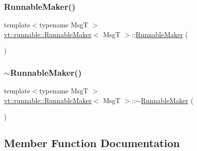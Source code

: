 \subsubsection{\texorpdfstring{Runnable\+Maker()}{RunnableMaker()}\hspace{0.1cm}{\footnotesize\ttfamily [3/3]}}
{\footnotesize\ttfamily template$<$typename MsgT $>$ \\
\hyperlink{structvt_1_1runnable_1_1_runnable_maker}{vt\+::runnable\+::\+Runnable\+Maker}$<$ MsgT $>$\+::\hyperlink{structvt_1_1runnable_1_1_runnable_maker}{Runnable\+Maker} (\begin{DoxyParamCaption}\item[{\hyperlink{structvt_1_1runnable_1_1_runnable_maker}{Runnable\+Maker}$<$ MsgT $>$ \&\&}]{ }\end{DoxyParamCaption})\hspace{0.3cm}{\ttfamily [default]}}

\mbox{\label{structvt_1_1runnable_1_1_runnable_maker_a0700d91c1114ae97ac74a4841ec2499c}} 
\subsubsection{\texorpdfstring{$\sim$\+Runnable\+Maker()}{~RunnableMaker()}}
{\footnotesize\ttfamily template$<$typename MsgT $>$ \\
\hyperlink{structvt_1_1runnable_1_1_runnable_maker}{vt\+::runnable\+::\+Runnable\+Maker}$<$ MsgT $>$\+::$\sim$\hyperlink{structvt_1_1runnable_1_1_runnable_maker}{Runnable\+Maker} (\begin{DoxyParamCaption}{ }\end{DoxyParamCaption})\hspace{0.3cm}{\ttfamily [inline]}}



\subsection{Member Function Documentation}
\mbox{\label{structvt_1_1runnable_1_1_runnable_maker_a76516d824c744bdd347806012a78e19b}} 
